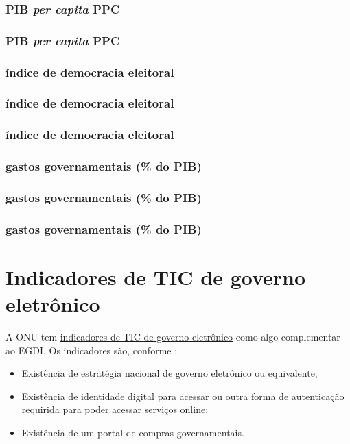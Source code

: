 \subsubsection{PIB \textit{per capita} PPC}

\subsubsection{PIB \textit{per capita} PPC}

\subsubsection{índice de democracia eleitoral}

\subsubsection{índice de democracia eleitoral}

\subsubsection{índice de democracia eleitoral}

\subsubsection{gastos governamentais (\% do PIB)}

\subsubsection{gastos governamentais (\% do PIB)}

\subsubsection{gastos governamentais (\% do PIB)}



\section{Indicadores de TIC de governo eletrônico}
\label{indicadores_tic_egov}

A ONU tem \href{https://publicadministration.un.org/egovkb/en-us/Data/ICT-in-government}{indicadores de TIC de governo eletrônico} como algo complementar ao EGDI. Os indicadores são, conforme \cite{ONU_ICT_in_government_indicators}:

\begin{itemize}
	\item Existência de estratégia nacional de governo eletrônico ou equivalente;
	\item Existência de identidade digital para acessar ou outra forma de autenticação requirida para poder acessar serviços online;
	\item Existência de um portal de compras governamentais.
\end{itemize}

